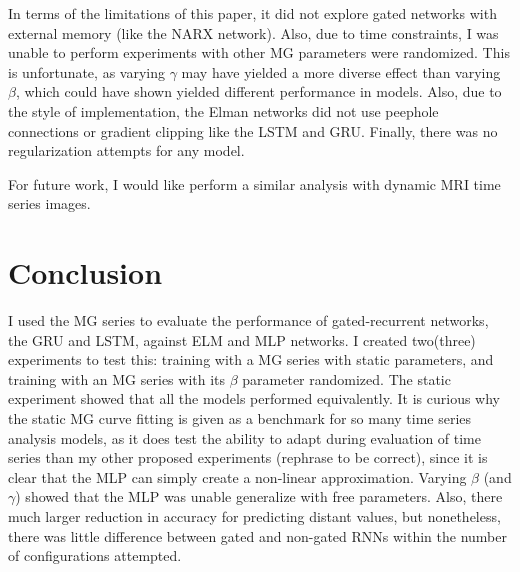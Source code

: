 \documentclass[11pt]{article}
\begin{document}
In terms of the limitations of this paper, it did not explore gated
networks with external memory (like the NARX network). Also, due to
time constraints, I was unable to perform experiments with other MG
parameters were randomized. This is unfortunate, as varying $\gamma$
may have yielded a more diverse effect than varying $\beta$, which
could have shown yielded different performance in models. Also, due to
the style of implementation, the Elman networks did not use peephole
connections or gradient clipping like the LSTM and GRU. Finally, there
was no regularization attempts for any model.

For future work, I would like perform a similar analysis with dynamic
MRI time series images.

 \section{Conclusion}
I used the MG series to evaluate the performance of gated-recurrent
networks, the GRU and LSTM, against ELM and MLP networks. I created
two(three) experiments to test this: training with a MG series with
static parameters, and training with an MG series with its $\beta$
parameter randomized. The static experiment showed that all the models performed
equivalently.
It is curious why the static MG curve fitting is given as a benchmark
for so many time series analysis models, as it does test the ability
to adapt during evaluation of time series than my other
proposed experiments (rephrase to be correct), since it is clear that
the MLP can simply create a non-linear approximation. Varying $\beta$
(and $\gamma$) showed that the MLP was unable generalize with free
parameters. Also, there much larger reduction in accuracy for
predicting distant values, but nonetheless, there was little
difference between gated and non-gated RNNs within the number
of configurations attempted.



\end{document}
